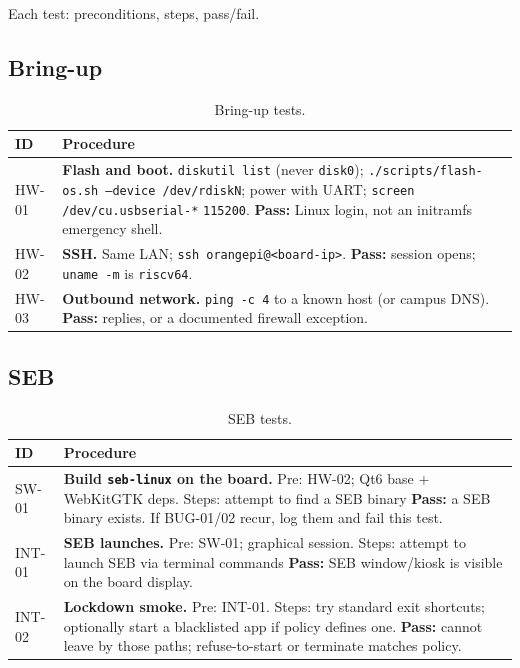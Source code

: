 \documentclass[11pt]{article}
\begin{document}
Each test: preconditions, steps, pass/fail.

\subsection{Bring-up}

\begin{table}[H]
  \centering
  \footnotesize
  \setlength{\tabcolsep}{3pt}
  \begin{tabularx}{\textwidth}{@{}p{}X@{}}
    \toprule
    \textbf{ID} & \textbf{Procedure} \\
    \midrule
    HW-01 &
    \textbf{Flash and boot.} \texttt{diskutil list} (never \texttt{disk0}); \texttt{./scripts/flash-os.sh --device /dev/rdiskN}; power with UART; \texttt{screen /dev/cu.usbserial-*} \texttt{115200}.
    \textbf{Pass:} Linux login, not an initramfs emergency shell. \\
    HW-02 &
    \textbf{SSH.} Same LAN; \texttt{ssh orangepi@<board-ip>}.
    \textbf{Pass:} session opens; \texttt{uname -m} is \texttt{riscv64}. \\
    HW-03 &
    \textbf{Outbound network.} \texttt{ping -c 4} to a known host (or campus DNS).
    \textbf{Pass:} replies, or a documented firewall exception. \\
    \bottomrule
  \end{tabularx}
  \caption{Bring-up tests.}
  \label{tab:hw}
\end{table}

\subsection{SEB}

\begin{table}[H]
  \centering
  \footnotesize
  \setlength{\tabcolsep}{3pt}
  \begin{tabularx}{\textwidth}{@{}p{}X@{}}
    \toprule
    \textbf{ID} & \textbf{Procedure} \\
    \midrule
    SW-01 &
    \textbf{Build \texttt{seb-linux} on the board.} Pre: HW-02; Qt6 base + WebKitGTK deps.
    Steps: attempt to find a SEB binary
    \textbf{Pass:} a SEB binary exists. If BUG-01/02 recur, log them and fail this test. \\
    INT-01 &
    \textbf{SEB launches.} Pre: SW-01; graphical session.
    Steps: attempt to launch SEB via terminal commands
    \textbf{Pass:} SEB window/kiosk is visible on the board display. \\
    INT-02 &
    \textbf{Lockdown smoke.} Pre: INT-01.
    Steps: try standard exit shortcuts; optionally start a blacklisted app if policy defines one.
    \textbf{Pass:} cannot leave by those paths; refuse-to-start or terminate matches policy. \\
    \bottomrule
  \end{tabularx}
  \caption{SEB tests.}
  \label{tab:seb}
\end{table}
\end{document}
